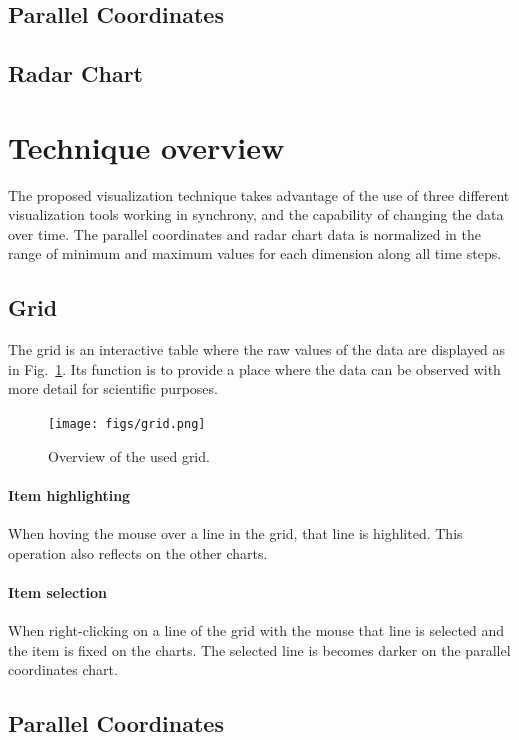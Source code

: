 \documentclass[10pt, conference]{IEEEtran}
\begin{document}
\subsection{Parallel Coordinates}

\subsection{Radar Chart}

\section{Technique overview}
%

The proposed visualization technique takes advantage of the use of three different visualization tools working in synchrony, and the capability of changing the data over time. The parallel coordinates and radar chart data is normalized in the range of minimum and maximum values for each dimension along all time steps.

\subsection{Grid}

The grid is an interactive table where the raw values of the data are displayed as in Fig.~\ref{fig:grid}. Its function is to provide a place where the data can be observed with more detail for scientific purposes.

\begin{figure}
\texttt{[image: figs/grid.png]}
\caption{Overview of the used grid.} 
\label{fig:grid}
\end{figure}
\paragraph*{Item highlighting} When hoving the mouse over a line in the grid, that line is highlited. This operation also reflects on the other charts.
\paragraph*{Item selection} When right-clicking on a line of the grid with the mouse that line is selected and the item is fixed on the charts. The selected line is becomes darker on the parallel coordinates chart.

\subsection{Parallel Coordinates}
\end{document}
